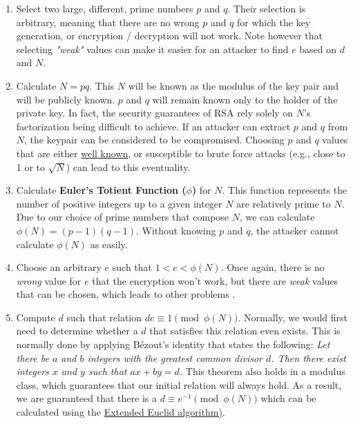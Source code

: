 \begin{enumerate}
    \item Select two large, different, prime numbers $p$ and $q$. Their
          selection is arbitrary, meaning that there are no wrong $p$ and $q$
          for which the key generation, or encryption / decryption will not work.
          Note however that selecting \textit{"weak"} values can make it easier
          for an attacker to find $e$ based on $d$ and $N$.

    \item Calculate $N = pq$. This $N$ will be known as the modulus of the
          key pair and will be publicly known. $p$ and $q$ will remain known
          only to the holder of the private key. In fact, the security guarantees
          of RSA rely solely on $N$'s factorization being difficult to achieve.
          If an attacker can extract $p$ and $q$ from $N$, the keypair can be
          considered to be compromised. Choosing $p$ and $q$ values that are
          either \href{https://factordb.com/}{well known}, or susceptible to
          brute force attacks (e.g., close to 1 or to $\sqrt{N}$) can lead to
          this eventuality.

    \item Calculate \textbf{Euler's Totient Function ($\phi$)} for $N$. This function
          represents the number of positive integers up to a given integer $N$
          are relatively prime to $N$. Due to our choice of prime numbers that
          compose $N$, we can calculate $\phi(N) = (p - 1) (q - 1)$. Without
          knowing $p$ and $q$, the attacker cannot calculate $\phi(N)$ as easily.

    \item Choose an arbitrary $e$ such that $1 < e < \phi(N)$. Once again, there is
          no \textit{wrong} value for $e$ that the encryption won't work, but
          there are \textit{weak} values that can be chosen, which leads to
          other problems \cite{jochemsz2007polynomial}.

      \item Compute $d$ such that relation $de \equiv 1 \pmod{\phi(N)}$. Normally, we would
          first need to determine whether a $d$ that satisfies this relation
          even exists. This is normally done by applying Bézout's identity
          that states the following: \textit{Let there be $a$ and $b$ integers
          with the greatest common divisor $d$. Then there exist integers $x$
          and $y$ such that $ax + by = d$.} This theorem also holds in a
          modulus class, which guarantees that our initial relation will always
          hold. As a result, we are guaranteed that there is a $d \equiv e^{-1}
          \pmod{\phi(N)}$ which can be calculated using the
          \href{https://cp-algorithms.com/algebra/extended-euclid-algorithm.html}
          {Extended Euclid algorithm)}.
\end{enumerate}
